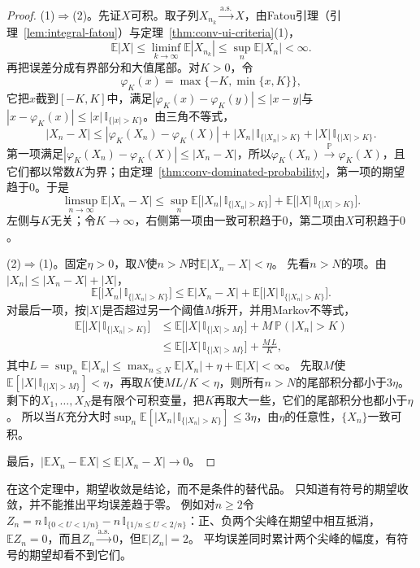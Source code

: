 \begin{proof}
(1)$\Rightarrow$(2)。先证$X$可积。取子列$X_{n_k}\xrightarrow{\mathrm{a.s.}}X$，由Fatou引理（引理~\ref{lem:integral-fatou}）与定理~\ref{thm:conv-ui-criteria}(1)，
\[
  \mathbb E|X|\leq\liminf_{k\to\infty}\mathbb E|X_{n_{k}}|\leq\sup_n\mathbb E|X_n|<\infty.
\]
再把误差分成有界部分和大值尾部。对$K>0$，令
\[
  \varphi_K(x)=\max\{-K,\min\{x,K\}\},
\]
它把$x$截到$[-K,K]$中，满足$|\varphi_K(x)-\varphi_K(y)|\leq|x-y|$与$|x-\varphi_K(x)|\leq|x|\,\mathbb I_{\{|x|>K\}}$。由三角不等式，
\[
  |X_n-X|\leq|\varphi_K(X_n)-\varphi_K(X)|+|X_n|\,\mathbb I_{\{|X_n|>K\}}+|X|\,\mathbb I_{\{|X|>K\}}.
\]
第一项满足$|\varphi_K(X_n)-\varphi_K(X)|\leq|X_n-X|$，所以$\varphi_K(X_n)\xrightarrow{\mathbb P}\varphi_K(X)$，且它们都以常数$K$为界；由定理~\ref{thm:conv-dominated-probability}，第一项的期望趋于$0$。于是
\[
  \limsup_{n\to\infty}\mathbb E|X_n-X|\leq\sup_n\mathbb E\bigl[|X_n|\,\mathbb I_{\{|X_n|>K\}}\bigr]+\mathbb E\bigl[|X|\,\mathbb I_{\{|X|>K\}}\bigr].
\]
左侧与$K$无关；令$K\to\infty$，右侧第一项由一致可积趋于$0$，第二项由$X$可积趋于$0$。

(2)$\Rightarrow$(1)。固定$\eta>0$，取$N$使$n>N$时$\mathbb E|X_n-X|<\eta$。
先看$n>N$的项。由$|X_n|\leq|X_n-X|+|X|$，
\[
  \mathbb E\bigl[|X_n|\,\mathbb I_{\{|X_n|>K\}}\bigr]\leq\mathbb E|X_n-X|+\mathbb E\bigl[|X|\,\mathbb I_{\{|X_n|>K\}}\bigr].
\]
对最后一项，按$|X|$是否超过另一个阈值$M$拆开，并用Markov不等式，
\[
  \begin{aligned}
  \mathbb E\bigl[|X|\,\mathbb I_{\{|X_n|>K\}}\bigr]
  &\leq\mathbb E\bigl[|X|\,\mathbb I_{\{|X|>M\}}\bigr]+M\,\mathbb P(|X_n|>K)\\
  &\leq\mathbb E\bigl[|X|\,\mathbb I_{\{|X|>M\}}\bigr]+\frac{M\,L}{K},
  \end{aligned}
\]
其中$L=\sup_n\mathbb E|X_n|\leq\max_{n\leq N}\mathbb E|X_n|+\eta+\mathbb E|X|<\infty$。
先取$M$使$\mathbb E[|X|\,\mathbb I_{\{|X|>M\}}]<\eta$，再取$K$使$ML/K<\eta$，则所有$n>N$的尾部积分都小于$3\eta$。
剩下的$X_1,\ldots,X_N$是有限个可积变量，把$K$再取大一些，它们的尾部积分也都小于$\eta$。
所以当$K$充分大时$\sup_n\mathbb E[|X_n|\,\mathbb I_{\{|X_n|>K\}}]\leq3\eta$，由$\eta$的任意性，$\{X_n\}$一致可积。

最后，$|\mathbb EX_n-\mathbb EX|\leq\mathbb E|X_n-X|\to0$。
\end{proof}

在这个定理中，期望收敛是结论，而不是条件的替代品。
只知道有符号的期望收敛，并不能推出平均误差趋于零。
例如对$n\geq2$令$Z_n=n\,\mathbb I_{\{0<U<1/n\}}-n\,\mathbb I_{\{1/n\leq U<2/n\}}$：正、负两个尖峰在期望中相互抵消，$\mathbb EZ_n=0$，而且$Z_n\xrightarrow{\mathrm{a.s.}}0$，但$\mathbb E|Z_n|=2$。
平均误差同时累计两个尖峰的幅度，有符号的期望却看不到它们。

